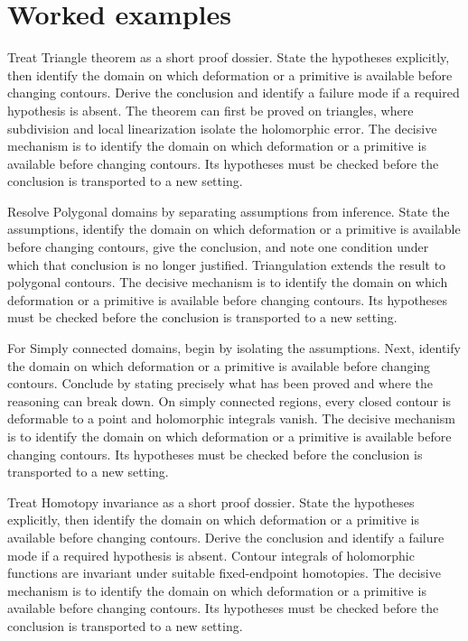 \section{Worked examples}

\begin{example}\label{ex:iv05-worked-01}
Treat Triangle theorem as a short proof dossier. State the hypotheses explicitly, then identify the domain on which deformation or a primitive is available before changing contours. Derive the conclusion and identify a failure mode if a required hypothesis is absent. The theorem can first be proved on triangles, where subdivision and local linearization isolate the holomorphic error. The decisive mechanism is to identify the domain on which deformation or a primitive is available before changing contours. Its hypotheses must be checked before the conclusion is transported to a new setting.
\end{example}

\begin{example}\label{ex:iv05-worked-02}
Resolve Polygonal domains by separating assumptions from inference. State the assumptions, identify the domain on which deformation or a primitive is available before changing contours, give the conclusion, and note one condition under which that conclusion is no longer justified. Triangulation extends the result to polygonal contours. The decisive mechanism is to identify the domain on which deformation or a primitive is available before changing contours. Its hypotheses must be checked before the conclusion is transported to a new setting.
\end{example}

\begin{example}\label{ex:iv05-worked-03}
For Simply connected domains, begin by isolating the assumptions. Next, identify the domain on which deformation or a primitive is available before changing contours. Conclude by stating precisely what has been proved and where the reasoning can break down. On simply connected regions, every closed contour is deformable to a point and holomorphic integrals vanish. The decisive mechanism is to identify the domain on which deformation or a primitive is available before changing contours. Its hypotheses must be checked before the conclusion is transported to a new setting.
\end{example}

\begin{example}\label{ex:iv05-worked-04}
Treat Homotopy invariance as a short proof dossier. State the hypotheses explicitly, then identify the domain on which deformation or a primitive is available before changing contours. Derive the conclusion and identify a failure mode if a required hypothesis is absent. Contour integrals of holomorphic functions are invariant under suitable fixed-endpoint homotopies. The decisive mechanism is to identify the domain on which deformation or a primitive is available before changing contours. Its hypotheses must be checked before the conclusion is transported to a new setting.
\end{example}

